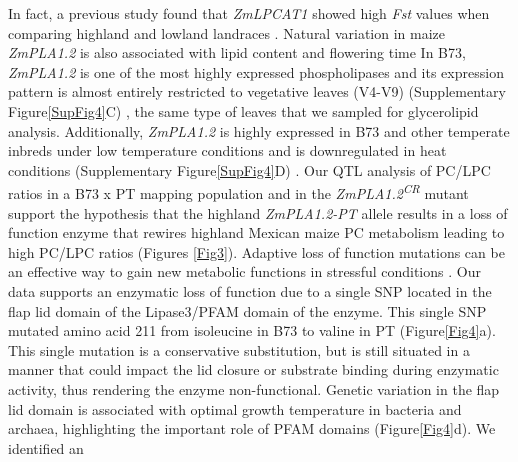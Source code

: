 \documentclass[9pt,twocolumn,twoside]{BioRxiv}
\begin{document}
In fact, a previous study found that \textit{ZmLPCAT1} showed high \textit{Fst} values when comparing highland and lowland landraces \cite{Takuno2015-uj}.
Natural variation in maize \textit{ZmPLA1.2} is also associated with lipid content \cite{Riedelsheimer2012-bx} and flowering time \cite{Chen2012-gg, Hung2012-ms} 
In B73, \textit{ZmPLA1.2} is one of the most highly expressed phospholipases and its expression pattern is almost entirely restricted to vegetative leaves (V4-V9) (Supplementary Figure\ref{SupFig4}C) \cite{Stelpflug2016-vr}, the same type of leaves that we sampled for glycerolipid analysis. 
Additionally, \textit{ZmPLA1.2} is highly expressed in B73 and other temperate inbreds under low temperature conditions and is downregulated in heat conditions (Supplementary Figure\ref{SupFig4}D) \cite{Waters2017-nat}.
Our QTL analysis of PC/LPC ratios in a B73 x PT mapping population and in the \textit{ZmPLA1.2\textsuperscript{CR}} mutant support the hypothesis that the highland \textit{ZmPLA1.2-PT} allele results in a loss of function enzyme that rewires highland Mexican maize PC metabolism leading to high PC/LPC ratios (Figures \ref{Fig3}). 
Adaptive loss of function mutations can be an effective way to gain new metabolic functions in stressful conditions \cite{Hottes2013-np}. 
Our data supports an enzymatic loss of function due to a single SNP located in the flap lid domain of the Lipase3/PFAM domain of the enzyme.
This single SNP mutated amino acid 211 from isoleucine in B73 to valine in PT (Figure\ref{Fig4}a).
This single mutation is a conservative substitution, but is still situated in a manner that could impact the lid closure or substrate binding during enzymatic activity, thus rendering the enzyme non-functional. 
Genetic variation in the flap lid domain is associated with optimal growth temperature in bacteria and archaea, highlighting the important role of PFAM domains  (Figure\ref{Fig4}d).
We identified an 
\end{document}
